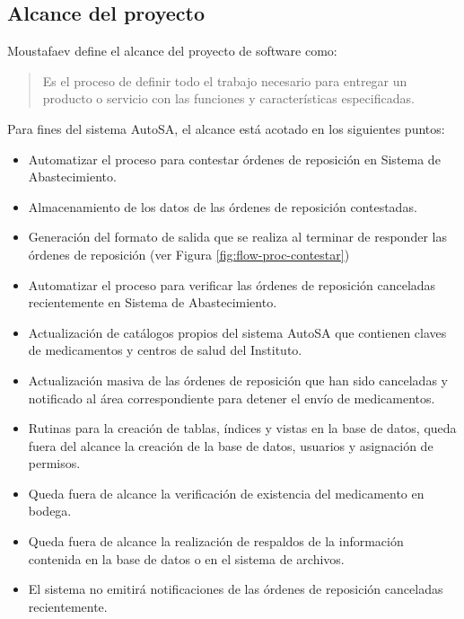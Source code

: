 \subsection{Alcance del proyecto}\label{sec:alcance}
Moustafaev\cite{ScopeManagement} define el alcance del proyecto de software como:
\begin{quote}
Es el proceso de definir todo el trabajo necesario para entregar un producto o servicio con las funciones y características especificadas.
\end{quote}
Para fines del sistema AutoSA, el alcance está acotado en los siguientes puntos:
\begin{itemize}
\item Automatizar el proceso para contestar órdenes de reposición en Sistema de Abastecimiento.
\item Almacenamiento de los datos de las órdenes de reposición contestadas.
\item Generación del formato de salida que se realiza al terminar de responder las órdenes de reposición (ver Figura \ref{fig:flow-proc-contestar})
\item Automatizar el proceso para verificar las órdenes de reposición canceladas recientemente en Sistema de Abastecimiento.
\item Actualización de catálogos propios del sistema AutoSA que contienen claves de medicamentos y centros de salud del Instituto.
\item Actualización masiva de las órdenes de reposición que han sido canceladas y notificado al área correspondiente para detener el envío de medicamentos.
\item Rutinas para la creación de tablas, índices y vistas en la base de datos, queda fuera del alcance la creación de la base de datos, usuarios y asignación de permisos. 
\item Queda fuera de alcance la verificación de existencia del medicamento en bodega.
\item Queda fuera de alcance la realización de respaldos de la información contenida en la base de datos o en el sistema de archivos.
\item El sistema no emitirá notificaciones de las órdenes de reposición canceladas recientemente.
\end{itemize}


